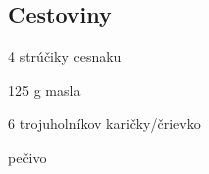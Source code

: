 \setcounter{step}{0}
\subsection{Cestoviny}

\begin{ingredient}
\begin{main}
	\item 4 strúčiky cesnaku
	\item 125 g masla
	\item 6 trojuholníkov karičky/črievko
  \item pečivo
\end{main}
\end{ingredient}%
\begin{recipe}


\end{recipe}

\begin{notes}

\end{notes}	
